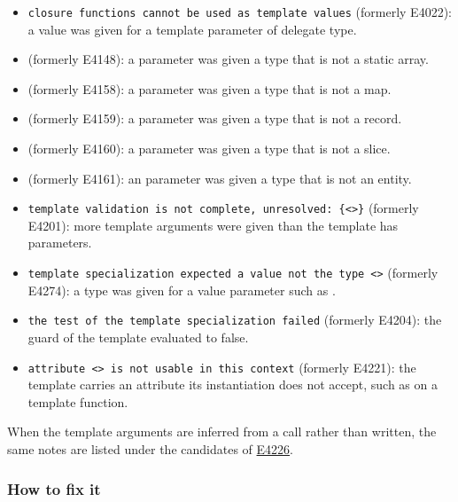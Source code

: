 \begin{itemize}
\item \texttt{closure functions cannot be used as template values} (formerly E4022): a value was given for a template parameter of delegate type.
\item {} (formerly E4148): a  parameter was given a type that is not a static array.
\item {} (formerly E4158): a  parameter was given a type that is not a map.
\item {} (formerly E4159): a  parameter was given a type that is not a record.
\item {} (formerly E4160): a  parameter was given a type that is not a slice.
\item {} (formerly E4161): an  parameter was given a type that is not an entity.
\item \texttt{template validation is not complete, unresolved: \{\textless{}\textgreater{}\}} (formerly E4201): more template arguments were given than the template has parameters.
\item \texttt{template specialization expected a value not the type \textless{}\textgreater{}} (formerly E4274): a type was given for a value parameter such as .
\item \texttt{the test of the template specialization failed} (formerly E4204): the  guard of the template evaluated to false.
\item \texttt{attribute \textless{}\textgreater{} is not usable in this context} (formerly E4221): the template carries an attribute its instantiation does not accept, such as  on a template function.
\end{itemize}

When the template arguments are inferred from a call rather than written, the same notes are listed under the candidates of \hyperref[sec:codes:e4226]{E4226}.

\subsubsection*{How to fix it}

